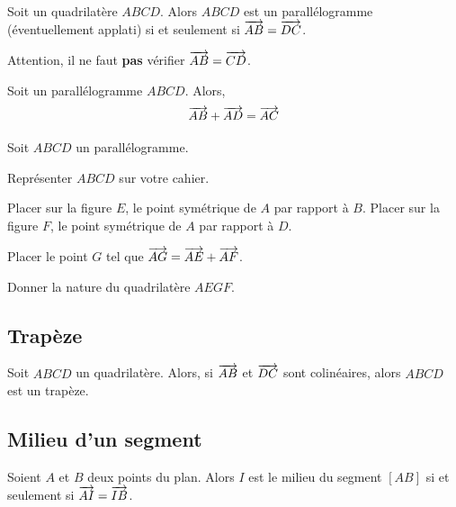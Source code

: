 \documentclass{poly}
\begin{document}
\begin{proposition}
Soit un quadrilatère $ABCD$. Alors $ABCD$ est un parallélogramme (éventuellement applati) si et seulement si $\overrightarrow{AB} = \overrightarrow{DC}$.
\end{proposition}

\begin{remark}
Attention, il ne faut \textbf{pas} vérifier $\overrightarrow{AB} = \overrightarrow{CD}$.        
\end{remark}

\begin{proposition}
Soit un parallélogramme $ABCD$. Alors,
\begin{equation*}
\overrightarrow{AB} + \overrightarrow{AD} = \overrightarrow{AC}
\end{equation*}
\end{proposition}

\begin{example}
Soit $ABCD$ un parallélogramme.
\begin{alphaquestions}
\item Représenter $ABCD$ sur votre cahier.
\item Placer sur la figure $E$, le point symétrique de $A$ par rapport à $B$. Placer sur la figure $F$, le point symétrique de $A$ par rapport à $D$.
\item Placer le point $G$ tel que $\overrightarrow{AG} = \overrightarrow{AE} + \overrightarrow{AF}$.
\item Donner la nature du quadrilatère $AEGF$.
\end{alphaquestions}

\end{example}

\newpage
\subsection{Trapèze}
\begin{proposition}
Soit $ABCD$ un quadrilatère. Alors, si $\overrightarrow{AB}$ et $\overrightarrow{DC}$ sont colinéaires, alors $ABCD$ est un trapèze.
\end{proposition}
\subsection{Milieu d'un segment}

\begin{proposition}
Soient $A$ et $B$ deux points du plan. Alors $I$ est le milieu du segment $[AB]$ si et seulement si $\overrightarrow{AI} = \overrightarrow{IB}$.
\end{proposition}
\end{document}
